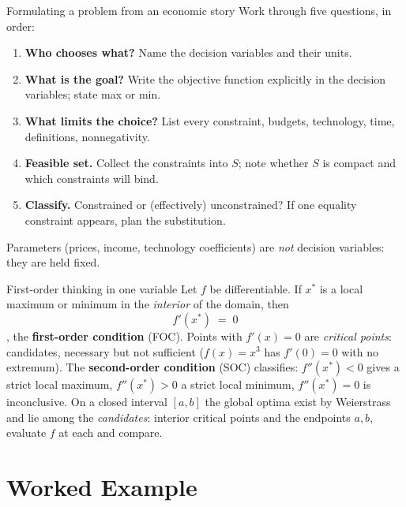 \begin{rulebox}{Formulating a problem from an economic story}
Work through five questions, in order:
\begin{enumerate}[leftmargin=1.9em,itemsep=0.3ex]
  \item \textbf{Who chooses what?} Name the decision variables and their
        units.
  \item \textbf{What is the goal?} Write the objective function
        explicitly in the decision variables; state max or min.
  \item \textbf{What limits the choice?} List every constraint,
        budgets, technology, time, definitions, nonnegativity.
  \item \textbf{Feasible set.} Collect the constraints into $S$; note
        whether $S$ is compact and which constraints will bind.
  \item \textbf{Classify.} Constrained or (effectively) unconstrained?
        If one equality constraint appears, plan the substitution.
\end{enumerate}
Parameters (prices, income, technology coefficients) are \emph{not}
decision variables: they are held fixed.
\end{rulebox}

\begin{rulebox}{First-order thinking in one variable}
Let $f$ be differentiable. If $x^{*}$ is a local maximum or minimum in
the \emph{interior} of the domain, then
\[
  f'(x^{*}) \;=\; 0
\],
the \textbf{first-order condition} (FOC). Points with $f'(x)=0$ are \emph{critical points}: candidates, necessary but not sufficient
($f(x)=x^{3}$ has $f'(0)=0$ with no extremum). The
\textbf{second-order condition} (SOC) classifies:
$f''(x^{*})<0$ gives a strict local maximum, $f''(x^{*})>0$ a strict
local minimum, $f''(x^{*})=0$ is inconclusive. On a closed interval
$[a,b]$ the global optima exist by Weierstrass and lie among the
\emph{candidates}: interior critical points and the endpoints $a,b$,
evaluate $f$ at each and compare.
\end{rulebox}

\section{Worked Example}

